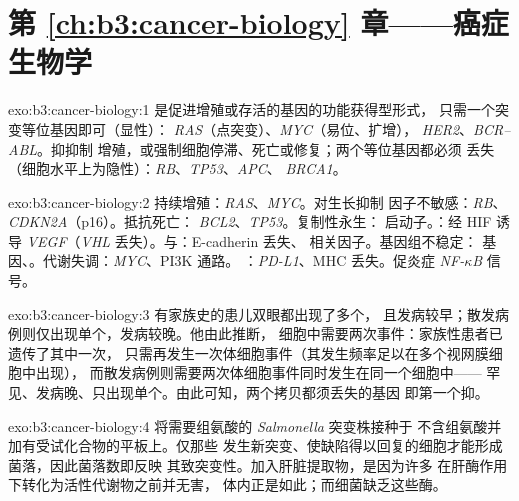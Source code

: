 \section*{第 \ref{ch:b3:cancer-biology} 章——癌症生物学}

\begin{solution}{exo:b3:cancer-biology:1}
是促进增殖或存活的基因的功能获得型形式，
只需一个突变等位基因即可（显性）：
\emph{RAS}（点突变）、\emph{MYC}（易位、扩增），
\emph{HER2}、\emph{BCR--ABL}。抑抑制
增殖，或强制细胞停滞、死亡或修复；两个等位基因都必须
丢失（细胞水平上为隐性）：\emph{RB}、\emph{TP53}、\emph{APC}、
\emph{BRCA1}。
\end{solution}

\begin{solution}{exo:b3:cancer-biology:2}
持续增殖：\emph{RAS}、\emph{MYC}。对生长抑制
因子不敏感：\emph{RB}、\emph{CDKN2A}（p16）。抵抗死亡：
\emph{BCL2}、\emph{TP53}。复制性永生：
启动子。：经 HIF 诱导 \emph{VEGF}（\emph{VHL}
丢失）。与：E-cadherin 丢失、
相关因子。基因组不稳定：
基因、\emph{}。代谢失调：\emph{MYC}、PI3K 通路。
：\emph{PD-L1}、MHC 丢失。促炎症
\emph{NF-$\kappa$B} 信号。
\end{solution}

\begin{solution}{exo:b3:cancer-biology:3}
有家族史的患儿双眼都出现了多个，
且发病较早；散发病例则仅出现单个，发病较晚。他由此推断，
细胞中需要两次事件：家族性患者已遗传了其中一次，
只需再发生一次体细胞事件（其发生频率足以在多个视网膜细胞中出现），
而散发病例则需要两次体细胞事件同时发生在同一个细胞中——
罕见、发病晚、只出现单个。由此可知，两个拷贝都须丢失的基因
即第一个抑。
\end{solution}

\begin{solution}{exo:b3:cancer-biology:4}
将需要组氨酸的 \emph{Salmonella} 突变株接种于
不含组氨酸并加有受试化合物的平板上。仅那些
发生新突变、使缺陷得以回复的细胞才能形成菌落，因此菌落数即反映
其致突变性。加入肝脏提取物，是因为许多
在肝酶作用下转化为活性代谢物之前并无害，
体内正是如此；而细菌缺乏这些酶。
\end{solution}

